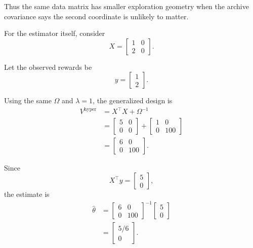 \documentclass{article} %
\begin{document}
Thus the same data matrix has smaller exploration geometry when the archive covariance says the second coordinate is unlikely to matter.

For the estimator itself, consider
\begin{equation}
\label{eq:hyper-example-X}
X=
\begin{bmatrix}
1&0\\
2&0
\end{bmatrix}.
\end{equation}

Let the observed rewards be
\begin{equation}
\label{eq:hyper-example-y}
y=
\begin{bmatrix}
1\\
2
\end{bmatrix}.
\end{equation}

Using the same \(\Omega\) and \(\lambda=1\), the generalized design is
\begin{align}
\label{eq:hyper-example-V}
V^{\mathrm{hyper}}
&=
X^\top X+\Omega^{-1}
\\
&=
\begin{bmatrix}
5&0\\
0&0
\end{bmatrix}
+
\begin{bmatrix}
1&0\\
0&100
\end{bmatrix}
\\
&=
\begin{bmatrix}
6&0\\
0&100
\end{bmatrix}.
\end{align}

Since
\begin{equation}
\label{eq:hyper-example-Xty}
X^\top y=
\begin{bmatrix}
5\\
0
\end{bmatrix},
\end{equation}
the estimate is
\begin{align}
\label{eq:hyper-example-theta}
\widehat{\theta}
&=
\begin{bmatrix}
6&0\\
0&100
\end{bmatrix}^{-1}
\begin{bmatrix}
5\\
0
\end{bmatrix}
\\
&=
\begin{bmatrix}
5/6\\
0
\end{bmatrix}.
\end{align}
\end{document}

